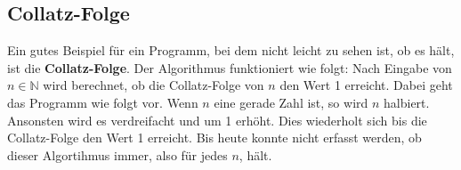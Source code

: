 \documentclass{article}
\newcommand{\N}{\mathbb{N}}%
\begin{document}
\subsection{Collatz-Folge
}
Ein gutes Beispiel für ein Programm, bei dem nicht leicht zu sehen ist, ob es hält, ist die \textbf{Collatz-Folge}. Der Algorithmus funktioniert wie folgt:
Nach Eingabe von \(n \in \N \) wird berechnet, ob die Collatz-Folge von $n$ den Wert 1 erreicht. Dabei geht das Programm wie folgt vor. Wenn $n$ eine gerade Zahl ist, so wird $n$ halbiert. Ansonsten wird es verdreifacht und um 1 erhöht. Dies wiederholt sich bis die Collatz-Folge den Wert 1 erreicht. Bis heute konnte nicht erfasst werden, ob dieser Algortihmus immer, also für jedes $n$, hält.







\end{document}
